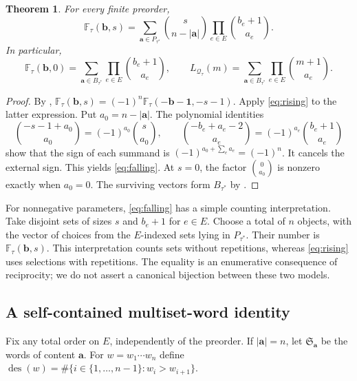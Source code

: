 \documentclass[11pt,letterpaper]{article}
\newtheorem{theorem}{Theorem}[section]
\theoremstyle{definition}
\newcommand{\one}{\mathbf 1}
\newcommand{\bvec}{\mathbf b}
\newcommand{\avec}{\mathbf a}
\newcommand{\QQ}{\mathcal Q}
\newcommand{\FF}{\mathbb F}
\DeclareMathOperator{\des}{des}
\newcommand{\sumv}[1]{\lvert #1\rvert}
\begin{document}
\begin{theorem}\label{thm:falling}
For every finite preorder,
\begin{equation}\label{eq:falling}
 \boxed{\FF_\tau(\bvec,s)=
 \sum_{\avec\in P_{\tau^*}}
       \binom{s}{n-\sumv{\avec}}
       \prod_{e\in E}\binom{b_e+1}{a_e}.}
\end{equation}
In particular,
\begin{equation}\label{eq:bases-formula}
 \FF_\tau(\bvec,0)=\sum_{\avec\in B_{\tau^*}}
                      \prod_{e\in E}\binom{b_e+1}{a_e},
 \qquad
 L_{\QQ_\tau}(m)=\sum_{\avec\in B_{\tau^*}}
                      \prod_{e\in E}\binom{m+1}{a_e}.
\end{equation}
\end{theorem}
\begin{proof}
By ,
$\FF_\tau(\bvec,s)=(-1)^n\FF_\tau(-\bvec-\one,-s-1)$.
Apply \eqref{eq:rising} to the latter expression. Put
$a_0=n-\sumv{\avec}$. The polynomial identities
\[
 \binom{-s-1+a_0}{a_0}=(-1)^{a_0}\binom{s}{a_0},\qquad
 \binom{-b_e+a_e-2}{a_e}=(-1)^{a_e}\binom{b_e+1}{a_e}
\]
show that the sign of each summand is
$(-1)^{a_0+\sum_e a_e}=(-1)^n$. It cancels the external sign. This yields
\eqref{eq:falling}. At $s=0$, the factor $\binom0{a_0}$ is nonzero exactly
when $a_0=0$. The surviving vectors form $B_{\tau^*}$ by
.
\end{proof}

For nonnegative parameters, \eqref{eq:falling} has a simple counting
interpretation. Take disjoint sets of sizes $s$ and $b_e+1$ for $e\in E$.
Choose a total of $n$ objects, with the vector of choices from the
$E$-indexed sets lying in $P_{\tau^*}$. Their number is
$\FF_\tau(\bvec,s)$. This interpretation counts sets without repetitions,
whereas \eqref{eq:rising} uses selections with repetitions. The equality is
an enumerative consequence of reciprocity; we do not assert a canonical
bijection between these two models.

\subsection{A self-contained multiset-word identity}
Fix any total order on $E$, independently of the preorder. If
$\sumv{\avec}=n$, let $\mathfrak S_\avec$ be the words of content $\avec$.
For $w=w_1\cdots w_n$ define
$\des(w)=\#\{i\in\{1,\ldots,n-1\}:w_i>w_{i+1}\}$.
\end{document}
